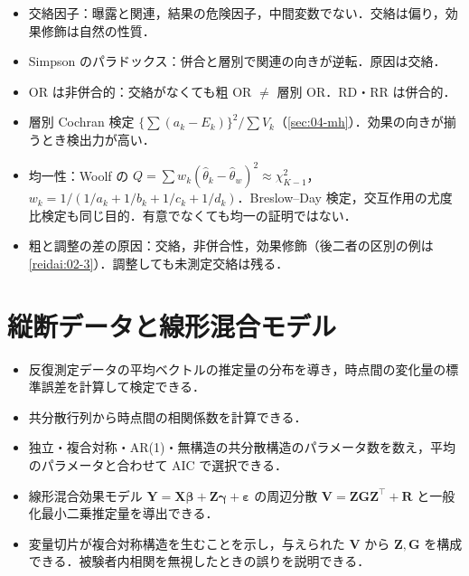 \documentclass[a4paper,11pt,openany]{ltjsbook}
\newcommand{\transp}{^{\top}}
\begin{document}
\begin{summarybox}
\begin{itemize}
\item 交絡因子：曝露と関連，結果の危険因子，中間変数でない．交絡は偏り，効果修飾は自然の性質．
\item Simpson のパラドックス：併合と層別で関連の向きが逆転．原因は交絡．
\item OR は非併合的：交絡がなくても粗 OR $\ne$ 層別 OR．RD・RR は併合的．
\item 層別 Cochran 検定 $\{\sum(a_k-E_k)\}^2/\sum V_k$（\cref{sec:04-mh}）．効果の向きが揃うとき検出力が高い．
\item 均一性：Woolf の $Q=\sum w_k(\hat\theta_k-\hat\theta_w)^2\approx\chi^2_{K-1}$，$w_k=1/(1/a_k+1/b_k+1/c_k+1/d_k)$．Breslow--Day 検定，交互作用の尤度比検定も同じ目的．有意でなくても均一の証明ではない．
\item 粗と調整の差の原因：交絡，非併合性，効果修飾（後二者の区別の例は\cref{reidai:02-3}）．調整しても未測定交絡は残る．
\end{itemize}
\end{summarybox}

\chapter{縦断データと線形混合モデル}\label{ch:08}

\begin{goalbox}
\begin{itemize}
\item 反復測定データの平均ベクトルの推定量の分布を導き，時点間の変化量の標準誤差を計算して検定できる．
\item 共分散行列から時点間の相関係数を計算できる．
\item 独立・複合対称・AR(1)・無構造の共分散構造のパラメータ数を数え，平均のパラメータと合わせて AIC で選択できる．
\item 線形混合効果モデル $\bm Y=\bm X\bm\beta+\bm Z\bm\gamma+\bm\varepsilon$ の周辺分散 $\bm V=\bm Z\bm G\bm Z\transp+\bm R$ と一般化最小二乗推定量を導出できる．
\item 変量切片が複合対称構造を生むことを示し，与えられた $\bm V$ から $\bm Z,\bm G$ を構成できる．被験者内相関を無視したときの誤りを説明できる．
\end{itemize}
\end{goalbox}
\end{document}
